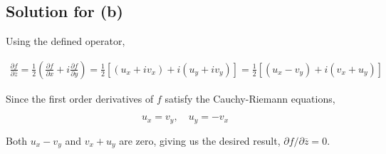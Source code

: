 \documentclass{scrartcl}
\begin{document}
\subsection{Solution for (b)}
Using the defined operator,

\begin{align*}
  \frac{\partial f}{\partial \overline{z}} = \frac{1}{2}\left( \frac{\partial f}{\partial x} + i \frac{\partial f}{\partial y} \right) = \frac{1}{2}\left[ (u_x + iv_x) + i(u_y + iv_y) \right] = \frac{1}{2}\left[ (u_x - v_y) + i(v_x + u_y) \right]
\end{align*}

Since the first order derivatives of \(f\) satisfy the Cauchy-Riemann equations,

\[
  u_x = v_y, \quad u_y = -v_x
\]

Both \(u_x - v_y\) and \(v_x + u_y\) are zero, giving us the desired result, \(\partial f / \partial \overline{z} = 0\).
\end{document}

